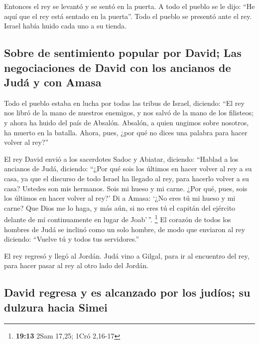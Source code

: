  Entonces el rey se levantó y se sentó en la puerta. A
todo el pueblo se le dijo: ``He aquí que el rey está sentado en la
puerta''. Todo el pueblo se presentó ante el rey. Israel había huido
cada uno a su tienda.

\hypertarget{sobre-de-sentimiento-popular-por-david-las-negociaciones-de-david-con-los-ancianos-de-juduxe1-y-con-amasa}{%
\subsection{Sobre de sentimiento popular por David; Las negociaciones de
David con los ancianos de Judá y con
Amasa}\label{sobre-de-sentimiento-popular-por-david-las-negociaciones-de-david-con-los-ancianos-de-juduxe1-y-con-amasa}}

 Todo el pueblo estaba en lucha por todas las tribus de
Israel, diciendo: ``El rey nos libró de la mano de nuestros enemigos, y
nos salvó de la mano de los filisteos; y ahora ha huido del país de
Absalón.  Absalón, a quien ungimos sobre nosotros, ha
muerto en la batalla. Ahora, pues, ¿por qué no dices una palabra para
hacer volver al rey?''

 El rey David envió a los sacerdotes Sadoc y Abiatar,
diciendo: ``Hablad a los ancianos de Judá, diciendo: ``¿Por qué sois los
últimos en hacer volver al rey a su casa, ya que el discurso de todo
Israel ha llegado al rey, para hacerlo volver a su casa? 
Ustedes son mis hermanos. Sois mi hueso y mi carne. ¿Por qué, pues, sois
los últimos en hacer volver al rey?'  Di a Amasa: `¿No
eres tú mi hueso y mi carne? Que Dios me lo haga, y más aún, si no eres
tú el capitán del ejército delante de mí continuamente en lugar de
Joab'\,''. \footnote{\textbf{19:13} 2Sam 17,25; 1Cró 2,16-17}
 El corazón de todos los hombres de Judá se inclinó como
un solo hombre, de modo que enviaron al rey diciendo: ``Vuelve tú y
todos tus servidores.''

 El rey regresó y llegó al Jordán. Judá vino a Gilgal,
para ir al encuentro del rey, para hacer pasar al rey al otro lado del
Jordán.

\hypertarget{david-regresa-y-es-alcanzado-por-los-juduxedos-su-dulzura-hacia-simei}{%
\subsection{David regresa y es alcanzado por los judíos; su dulzura
hacia
Simei}\label{david-regresa-y-es-alcanzado-por-los-juduxedos-su-dulzura-hacia-simei}}

